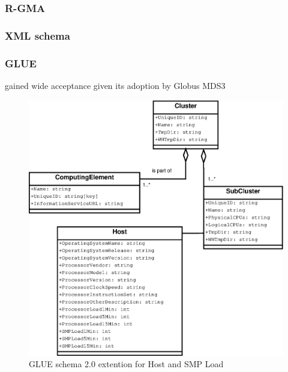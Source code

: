 \subsubsection{R-GMA}
\newpage

\subsubsection{XML schema}
\subsubsection{GLUE}
gained wide acceptance given its adoption by Globus MDS3
\newpage

\begin{figure}[htb]
\centering
 \includegraphics[width=5in]{images/gluece_ext.eps}
\caption{GLUE schema 2.0 extention for Host and SMP Load}
\label{figure:gluece_ext}
\end{figure}

\newpage

